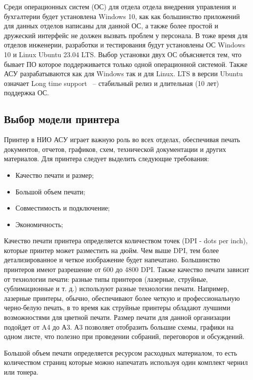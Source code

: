Среди операционных систем (ОС) для отдела отдела внедрения управления и бухгалтерии будет установлена Windows 10, как как большинство приложений для данных 
отделов написаны для данной ОС, а также более простой и дружеский интерфейс не должен вызвать проблем у персонала. 
В тоже время для отделов инженерии, разработки и тестирования будут установлены ОС Windows 10 и Linux Ubuntu 23.04 LTS. Выбор установки двух ОС объясняется тем,
что бывает ПО которое поддерживается только одной операционной системой. Также АСУ разрабатываются как для Windows так и для Linux. LTS в версии Ubuntu означает 
Long time support ~-- стабильный релиз и длительная (10 лет) поддержка ОС.

\subsection{Выбор модели принтера}

Принтер в НИО АСУ играет важную роль во всех отделах, 
обеспечивая печать документов, отчетов, графиков, схем, технической документации и других материалов.
Для принтера следует выделить следующие требования:

\begin{itemize}
    \item Качество печати и размер;
    \item Большой объем печати;
    \item Совместимость и подключение;
    \item Экономичность;
\end{itemize}

Качество печати принтера определяется количеством точек (DPI - dots per inch), которые принтер может разместить на дюйм. 
Чем выше DPI, тем более детализированное и четкое изображение будет напечатано. 
Большинство принтеров имеют разрешение от 600 до 4800 DPI. Также качество печати зависит от технологии печати: разные типы принтеров 
(лазерные, струйные, сублимационные и т. д.) используют разные технологии печати. Например, лазерные принтеры, обычно, обеспечивают 
более четкую и профессиональную черно-белую печать, в то время как струйные принтеры обладают лучшими возможностями для цветной печати.
Размер печати для данной организации подойдет от A4 до А3. А3 позволяет отобразить большие схемы, графики на одном листе, что полезно 
при проведении собраний, переговоров и обсуждений.

Большой объем печати определяется ресурсом расходных материалом, то есть количеством страниц которые можно напечатать используя один комплект 
чернил или тонера.

